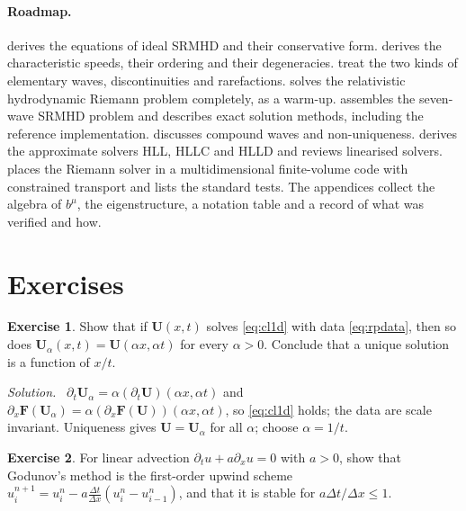 \documentclass[11pt,a4paper,oneside,openany]{book}
\theoremstyle{definition}
\newtheorem{exercise}{Exercise}[chapter]
\theoremstyle{plain}
\theoremstyle{remark}
\newenvironment{solution}{\par\smallskip\noindent\small\textit{Solution.}\ }{\par\medskip}
\newcommand{\UU}{\bm{U}}
\newcommand{\FF}{\bm{F}}
\begin{document}
\paragraph{Roadmap.}
 derives the equations of ideal SRMHD and their conservative form.
 derives the characteristic speeds, their ordering and their
degeneracies.  treat the two kinds of
elementary waves, discontinuities and rarefactions.  solves the
relativistic hydrodynamic Riemann problem completely, as a warm-up. 
assembles the seven-wave SRMHD problem and describes exact solution methods, including
the reference implementation.  discusses compound waves and
non-uniqueness.  derives the approximate solvers HLL, HLLC and HLLD and
reviews linearised solvers.  places the Riemann solver in a
multidimensional finite-volume code with constrained transport and lists the standard
tests. The appendices collect the algebra of $b^\mu$, the eigenstructure, a notation
table and a record of what was verified and how.

\section*{Exercises}

\begin{exercise}\label{ex:selfsimilar}
Show that if $\UU(x,t)$ solves \eqref{eq:cl1d} with data \eqref{eq:rpdata}, then so does
$\UU_\alpha(x,t)=\UU(\alpha x,\alpha t)$ for every $\alpha>0$. Conclude that a unique
solution is a function of $x/t$.
\end{exercise}
\begin{solution}
$\partial_t\UU_\alpha=\alpha(\partial_t\UU)(\alpha x,\alpha t)$ and
$\partial_x\FF(\UU_\alpha)=\alpha(\partial_x\FF(\UU))(\alpha x,\alpha t)$, so
\eqref{eq:cl1d} holds; the data are scale invariant. Uniqueness gives
$\UU=\UU_\alpha$ for all $\alpha$; choose $\alpha=1/t$.
\end{solution}

\begin{exercise}
For linear advection $\partial_t u+a\partial_x u=0$ with $a>0$, show that Godunov's
method is the first-order upwind scheme $u_i^{n+1}=u_i^n-a\frac{\Delta t}{\Delta x}
(u_i^n-u_{i-1}^n)$, and that it is stable for $a\Delta t/\Delta x\le1$.
\end{exercise}
\end{document}
